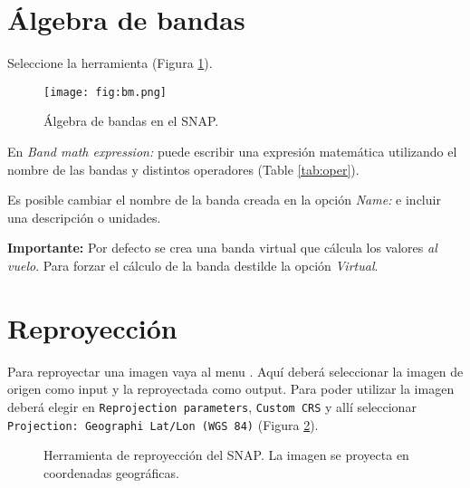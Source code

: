 \section{Álgebra de bandas}

 Seleccione la herramienta  (Figura \ref{fig:bm}).

 \begin{figure}[h!]
     \centering
     \texttt{[image: fig:bm.png]}
     \caption{Álgebra de bandas en el SNAP.}
     \label{fig:bm}
 \end{figure}

 En \emph{Band math expression:} puede escribir una expresión matemática utilizando el nombre de las bandas y distintos operadores (Table \ref{tab:oper}).

 Es posible cambiar el nombre de la banda creada en la opción \emph{Name:} e incluir una descripción o unidades.

 {\bf Importante:} Por defecto se crea una banda virtual que cálcula los valores \emph{al vuelo}. Para forzar el cálculo de la banda destilde la opción \emph{Virtual}.

 \section{Reproyección}

 Para reproyectar una imagen vaya al menu . Aquí deberá seleccionar la imagen de origen como input y la reproyectada como output. Para poder utilizar la imagen deberá elegir en \texttt{Reprojection parameters}, \texttt{Custom CRS} y allí seleccionar \texttt{Projection: Geographi Lat/Lon (WGS 84)} (Figura \ref{fig:reproj}).

 \begin{figure}[h!]
     \centering
     \hspace{1cm}
     \caption{Herramienta de reproyección del SNAP. La imagen se proyecta en coordenadas geográficas.}
     \label{fig:reproj}
 \end{figure}
